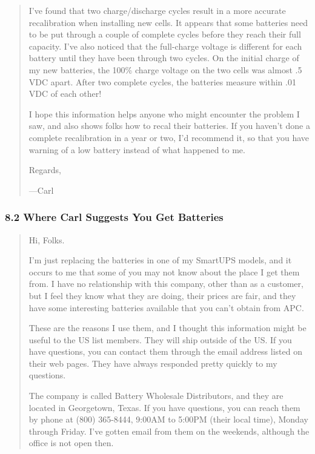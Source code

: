 {{{{{{{{{\begin{quote}
I've found that two charge/discharge cycles result in a more accurate
recalibration when installing new cells. It appears that some batteries need
to be put through a couple of complete cycles before they reach their full
capacity. I've also noticed that the full-charge voltage is different for each
battery until they have been through two cycles. On the initial charge of my
new batteries, the 100\% charge voltage on the two cells was almost .5 VDC
apart. After two complete cycles, the batteries measure within .01 VDC of each
other!  

I hope this information helps anyone who might encounter the problem I saw,
and also shows folks how to recal their batteries. If you haven't done a
complete recalibration in a year or two, I'd recommend it, so that you have
warning of a low battery instead of what happened to me.  

Regards,  

{---}Carl 
\end{quote}

\label{Where-Carl-Suggests-You-Get-Batteries}

\subsubsection*{8.2 Where Carl Suggests You Get Batteries}

\label{index-Batteries-146}

\begin{quote}

Hi, Folks.  

I'm just replacing the batteries in one of my SmartUPS models, and it occurs
to me that some of you may not know about the place I get them from. I have no
relationship with this company, other than as a customer, but I feel they know
what they are doing, their prices are fair, and they have some interesting
batteries available that you can't obtain from APC.  

These are the reasons I use them, and I thought this information might be
useful to the US list members. They will ship outside of the US. If you have
questions, you can contact them through the email address listed on their web
pages. They have always responded pretty quickly to my questions.  

The company is called Battery Wholesale Distributors, and they are located in
Georgetown, Texas. If you have questions, you can reach them by phone at (800)
365-8444, 9:00AM to 5:00PM (their local time), Monday through Friday. I've
gotten email from them on the weekends, although the office is not open then. 



\end{quote}}}}}}}}}}
